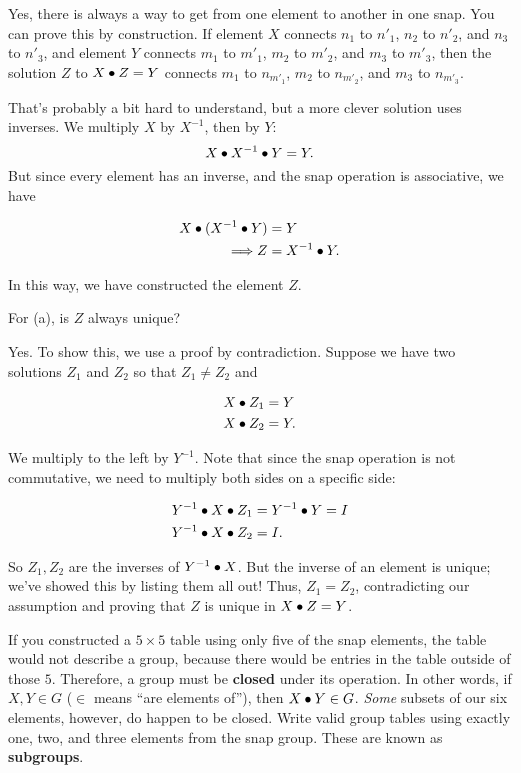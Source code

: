 \documentclass[../gatm_answers.tex]{subfiles}
\begin{document}
\noindent Yes, there is always a way to get from one element to another in one snap. You can prove this by construction. If element $X$ connects $n_1$ to $n'_1$, $n_2$ to $n'_2$, and $n_3$ to $n'_3$, and element $Y$ connects $m_1$ to $m'_1$, $m_2$ to $m'_2$, and $m_3$ to $m'_3$, then the solution $Z$ to $X\bullet Z=Y$ connects $m_1$ to $n_{m'_1}$, $m_2$ to $n_{m'_2}$, and $m_3$ to $n_{m'_3}$.

That's probably a bit hard to understand, but a more clever solution uses inverses. We multiply $X$ by $X^{-1}$, then by $Y$: $$X\bullet X^{-1}\bullet Y = Y.$$ But since every element has an inverse, and the snap operation is associative, we have

\begin{align*}
X\bullet (X^{-1} \bullet Y) &= Y \\
\Longrightarrow Z &= X^{-1} \bullet Y.
\end{align*}

\noindent In this way, we have constructed the element $Z$.

\begin{inner_problem}
	\item For (a), is $Z$ always unique?
\end{inner_problem}

\noindent Yes. To show this, we use a proof by contradiction. Suppose we have two solutions $Z_1$ and $Z_2$ so that $Z_1\neq Z_2$ and

\begin{align*}
X\bullet Z_1 &= Y \\
X\bullet Z_2 &= Y.
\end{align*}

\noindent We multiply to the left by $Y^{-1}$. Note that since the snap operation is not commutative, we need to multiply both sides on a specific side:

\begin{align*}
Y^{-1} \bullet X\bullet Z_1 &= Y^{-1} \bullet Y = I \\
Y^{-1} \bullet X\bullet Z_2 &= I.
\end{align*}

\noindent So $Z_1,Z_2$ are the inverses of $Y^{-1}\bullet X$. But the inverse of an element is unique; we've showed this by listing them all out! Thus, $Z_1=Z_2$, contradicting our assumption and proving that $Z$ is unique in $X\bullet Z = Y$.

\begin{outer_problem}
	\item If you constructed a $5\times 5$ table using only five of the snap elements, the table would not describe a group, because there would be entries in the table outside of those $5$. Therefore, a group must be \textbf{closed} under its operation. In other words, if $X,Y\in G$ ($\in$ means ``are elements of''), then $X\bullet Y\in G$. \textit{Some} subsets of our six elements, however, do happen to be closed. Write valid group tables using exactly one, two, and three elements from the snap group. These are known as \textbf{subgroups}.\label{prob:group_definition_end}
\end{outer_problem}
\end{document}
